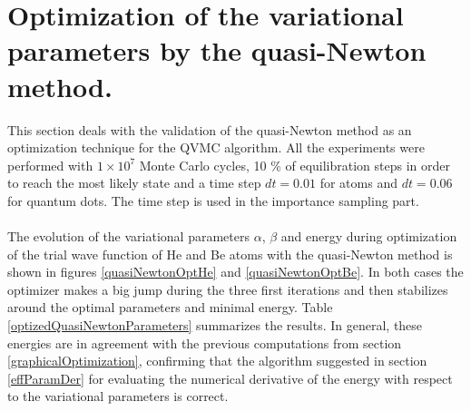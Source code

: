 
\section{Optimization of the variational parameters by the quasi-Newton method.}

This section deals with the validation of the quasi-Newton method as an optimization technique for the QVMC algorithm. All the experiments were performed with $1 \times 10^7$ Monte Carlo cycles, 10 \% of equilibration steps in order to reach the most likely state and  a time step $dt = 0.01$ for atoms and $dt = 0.06$ for quantum dots. The time step is used in the importance sampling part.\\
\\
\noindent
The evolution of the variational parameters $\alpha$, $\beta$ and energy during optimization of the trial wave function of He and Be atoms with the quasi-Newton method is shown in figures \ref{quasiNewtonOptHe} and \ref{quasiNewtonOptBe}. In both cases the optimizer makes a big jump during the three first iterations and then stabilizes around the optimal parameters and minimal energy. Table \ref{optizedQuasiNewtonParameters} summarizes the results. In general, these energies are in agreement with the previous computations from section \ref{graphicalOptimization}, confirming that the algorithm suggested in section \ref{effParamDer} for evaluating the numerical derivative of the energy with respect to the variational parameters is correct.\\

